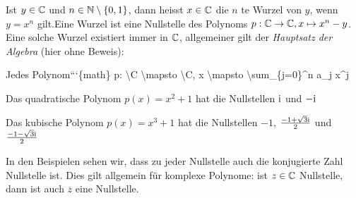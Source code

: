 Ist \(y \in \mathbb{C}\) und \(n\in \mathbb{N}\setminus\{0,1\}\), dann heisst \(x \in \mathbb{C}\) die \(n\) te Wurzel von \(y\), wenn \(y=x^n\) gilt.Eine Wurzel ist eine Nullstelle des Polynoms \(p:\mathbb{C} \rightarrow \mathbb{C}, x \mapsto x^n-y\). Eine solche Wurzel existiert immer in \(\mathbb{C}\), allgemeiner gilt der \emph{Hauptsatz der Algebra} (hier ohne Beweis):
\label{grundlagen/zahlensysteme:theorem-31}
\begin{theorem}{}{}



Jedes Polynom```\{math\}
p: \textbackslash{}C \textbackslash{}mapsto \textbackslash{}C, x \textbackslash{}mapsto \textbackslash{}sum\_\{j=0\}\textasciicircum{}n a\_j x\textasciicircum{}j


\end{theorem}
\label{grundlagen/zahlensysteme:example-32}
\begin{example}{}{}



Das quadratische Polynom \(p(x) =x^2+1\) hat die Nullstellen \(\mathrm{i}\) und \(-\mathrm{i}\)
\end{example}
\label{grundlagen/zahlensysteme:example-33}
\begin{example}{}{}



Das kubische Polynom \(p(x) =x^3+1\) hat die Nullstellen \(-1\), \(\frac{-1+\sqrt{3}\mathrm{i}}2\) und \(\frac{-1-\sqrt{3}\mathrm{i}}2\)
\end{example}

In den Beispielen sehen wir, dass zu jeder Nullstelle auch die konjugierte Zahl Nullstelle ist. Dies gilt allgemein für komplexe Polynome: ist \(z \in \mathbb{C}\) Nullstelle, dann ist auch \(\overline{z}\) eine Nullstelle.


